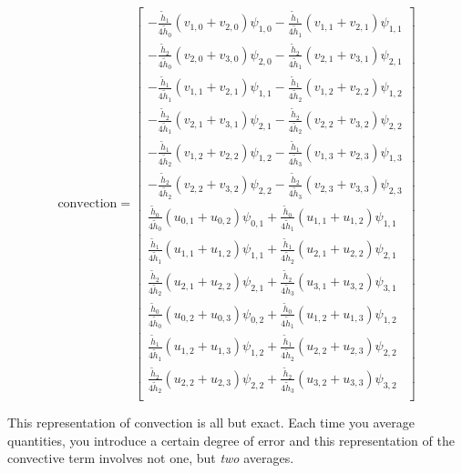 \begin{equation}
    \mbox{convection}
    =
    \begin{bmatrix}
    - \frac{\tilde{h}_1}{4 \tilde{h}_0} \left( v_{1,0} + v_{2,0} \right) \psi_{1,0} - \frac{\tilde{h}_1}{4 \tilde{h}_1} \left( v_{1,1} + v_{2,1} \right) \psi_{1,1} \\

    - \frac{\tilde{h}_2}{4 \tilde{h}_0} \left( v_{2,0} + v_{3,0} \right) \psi_{2,0} - \frac{\tilde{h}_2}{4 \tilde{h}_1} \left( v_{2,1} + v_{3,1} \right) \psi_{2,1} \\

    - \frac{\tilde{h}_1}{4 \tilde{h}_1} \left( v_{1,1} + v_{2,1} \right) \psi_{1,1} - \frac{\tilde{h}_1}{4 \tilde{h}_2} \left( v_{1,2} + v_{2,2} \right) \psi_{1,2} \\

    - \frac{\tilde{h}_2}{4 \tilde{h}_1} \left( v_{2,1} + v_{3,1} \right) \psi_{2,1} - \frac{\tilde{h}_2}{4 \tilde{h}_2} \left( v_{2,2} + v_{3,2} \right) \psi_{2,2} \\

    - \frac{\tilde{h}_1}{4 \tilde{h}_2} \left( v_{1,2} + v_{2,2} \right) \psi_{1,2} - \frac{\tilde{h}_1}{4 \tilde{h}_3} \left( v_{1,3} + v_{2,3} \right) \psi_{1,3} \\

    - \frac{\tilde{h}_2}{4 \tilde{h}_2} \left( v_{2,2} + v_{3,2} \right) \psi_{2,2} - \frac{\tilde{h}_2}{4 \tilde{h}_3} \left( v_{2,3} + v_{3,3} \right) \psi_{2,3} \\

    \frac{\tilde{h}_0}{4 \tilde{h}_0} \left( u_{0,1} + u_{0,2} \right) \psi_{0,1} + \frac{\tilde{h}_0}{4 \tilde{h}_1} \left( u_{1,1} + u_{1,2} \right) \psi_{1,1} \\

    \frac{\tilde{h}_1}{4 \tilde{h}_1} \left( u_{1,1} + u_{1,2} \right) \psi_{1,1} + \frac{\tilde{h}_1}{4 \tilde{h}_2} \left( u_{2,1} + u_{2,2} \right) \psi_{2,1} \\

    \frac{\tilde{h}_2}{4 \tilde{h}_2} \left( u_{2,1} + u_{2,2} \right) \psi_{2,1} + \frac{\tilde{h}_2}{4 \tilde{h}_3} \left( u_{3,1} + u_{3,2} \right) \psi_{3,1} \\

    \frac{\tilde{h}_0}{4 \tilde{h}_0} \left( u_{0,2} + u_{0,3} \right) \psi_{0,2} + \frac{\tilde{h}_0}{4 \tilde{h}_1} \left( u_{1,2} + u_{1,3} \right) \psi_{1,2} \\

    \frac{\tilde{h}_1}{4 \tilde{h}_1} \left( u_{1,2} + u_{1,3} \right) \psi_{1,2} + \frac{\tilde{h}_1}{4 \tilde{h}_2} \left( u_{2,2} + u_{2,3} \right) \psi_{2,2} \\

    \frac{\tilde{h}_2}{4 \tilde{h}_2} \left( u_{2,2} + u_{2,3} \right) \psi_{2,2} + \frac{\tilde{h}_2}{4 \tilde{h}_3} \left( u_{3,2} + u_{3,3} \right) \psi_{3,2} \\
    \end{bmatrix}
\end{equation}

This representation of convection is all but exact. Each time you average quantities, you introduce a certain degree of error and this representation of the convective term involves not one, but \emph{two} averages.
